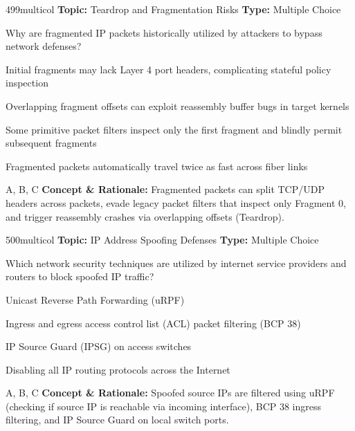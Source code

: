 \begin{qcard}{499}{multicol}
\textcolor{darkslate!75}{\small\textbf{Topic:} Teardrop and Fragmentation Risks \hfill \textbf{Type:} Multiple Choice}\vspace{0.4em}\par
Why are fragmented IP packets historically utilized by attackers to bypass network defenses?
\begin{qoptions}
\item Initial fragments may lack Layer 4 port headers, complicating stateful policy inspection
\item Overlapping fragment offsets can exploit reassembly buffer bugs in target kernels
\item Some primitive packet filters inspect only the first fragment and blindly permit subsequent fragments
\item Fragmented packets automatically travel twice as fast across fiber links
\end{qoptions}
\end{qcard}
\nopagebreak
\begin{explainbox}{A, B, C}
\textbf{Concept \& Rationale:} Fragmented packets can split TCP/UDP headers across packets, evade legacy packet filters that inspect only Fragment 0, and trigger reassembly crashes via overlapping offsets (Teardrop).
\end{explainbox}

\begin{qcard}{500}{multicol}
\textcolor{darkslate!75}{\small\textbf{Topic:} IP Address Spoofing Defenses \hfill \textbf{Type:} Multiple Choice}\vspace{0.4em}\par
Which network security techniques are utilized by internet service providers and routers to block spoofed IP traffic?
\begin{qoptions}
\item Unicast Reverse Path Forwarding (uRPF)
\item Ingress and egress access control list (ACL) packet filtering (BCP 38)
\item IP Source Guard (IPSG) on access switches
\item Disabling all IP routing protocols across the Internet
\end{qoptions}
\end{qcard}
\nopagebreak
\begin{explainbox}{A, B, C}
\textbf{Concept \& Rationale:} Spoofed source IPs are filtered using uRPF (checking if source IP is reachable via incoming interface), BCP 38 ingress filtering, and IP Source Guard on local switch ports.
\end{explainbox}

